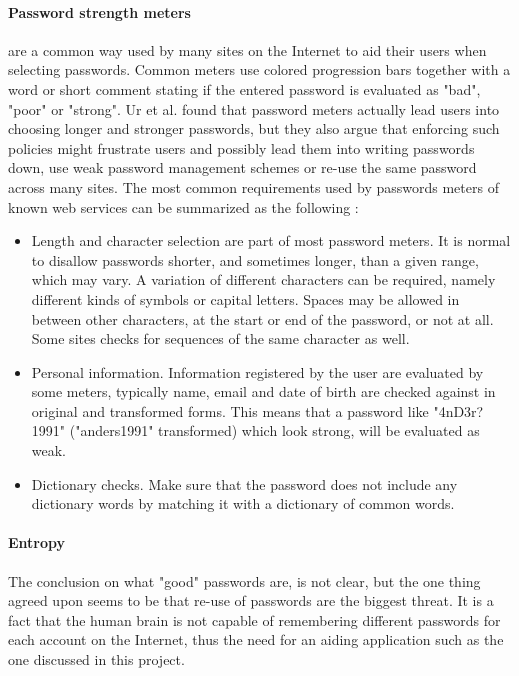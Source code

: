 \paragraph{Password strength meters} are a common way used by many sites on the Internet to aid their users when selecting passwords. Common meters use colored progression bars together with a word or short comment stating if the entered password is evaluated as "bad", "poor" or "strong". Ur et al. \cite{password-meters2} found that password meters actually lead users into choosing longer and stronger passwords, but they also argue that enforcing such policies might frustrate users and possibly lead them into writing passwords down, use weak password management schemes or re-use the same password across many sites. The most common requirements used by passwords meters of known web services can be summarized as the following \cite{password-meters}:
\begin{itemize}
    \item{Length and character selection} are part of most password meters. It is normal to disallow passwords shorter, and sometimes longer, than a given range, which may vary. A variation of different characters can be required, namely different kinds of symbols or capital letters. Spaces may be allowed in between other characters, at the start or end of the password, or not at all. Some sites checks for sequences of the same character as well.
    \item{Personal information.} Information registered by the user are evaluated by some meters, typically name, email and date of birth are checked against in original and transformed forms. This means that a password like "4nD3r?1991" ("anders1991" transformed) which look strong, will be evaluated as weak.
    \item{Dictionary checks.} Make sure that the password does not include any dictionary words by matching it with a dictionary of common words. 
\end{itemize}

\paragraph{Entropy}


\par The conclusion on what "good" passwords are, is not clear, but the one thing agreed upon seems to be that re-use of passwords are the biggest threat. It is a fact that the human brain is not capable of remembering different passwords for each account on the Internet, thus the need for an aiding application such as the one discussed in this project. 

